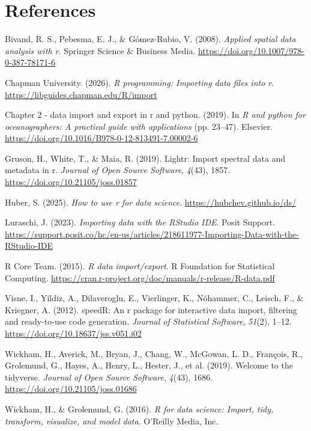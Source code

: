 \documentclass[
  doc,
  longtable,
  a4paper,
  nolmodern,
  notxfonts,
  notimes,
  colorlinks=true,linkcolor=blue,citecolor=blue,urlcolor=blue]{apa7}
\newlength{\cslhangindent}
\newenvironment{CSLReferences}[2] %
 {\begin{list}{}{%
  \setlength{\itemindent}{0pt}
  \setlength{\leftmargin}{0pt}
  \setlength{\parsep}{0pt}
  \ifodd #1
   \setlength{\leftmargin}{\cslhangindent}
   \setlength{\itemindent}{-1\cslhangindent}
  \fi
  \setlength{\itemsep}{#2\baselineskip}}}
 {\end{list}}
\begin{document}
\section{References}

\protect{}\label{refs}
\begin{CSLReferences}{1}{0}
Bivand, R. S., Pebesma, E. J., \& Gómez-Rubio, V. (2008). \emph{Applied
spatial data analysis with r}. Springer Science \& Business Media.
\url{https://doi.org/10.1007/978-0-387-78171-6}

Chapman University. (2026). \emph{R programming: Importing data files
into r}. \url{https://libguides.chapman.edu/R/import}

Chapter 2 - data import and export in r and python. (2019). In \emph{R
and python for oceanographers: A practical guide with applications} (pp.
23--47). Elsevier.
\url{https://doi.org/10.1016/B978-0-12-813491-7.00002-6}

Gruson, H., White, T., \& Maia, R. (2019). Lightr: Import spectral data
and metadata in r. \emph{Journal of Open Source Software}, \emph{4}(43),
1857. \url{https://doi.org/10.21105/joss.01857}

Huber, S. (2025). \emph{How to use r for data science}.
\url{https://hubchev.github.io/ds/}

Luraschi, J. (2023). \emph{Importing data with the RStudio IDE}. Posit
Support.
\url{https://support.posit.co/hc/en-us/articles/218611977-Importing-Data-with-the-RStudio-IDE}

R Core Team. (2015). \emph{R data import/export}. R Foundation for
Statistical Computing.
\url{https://cran.r-project.org/doc/manuals/r-release/R-data.pdf}

Visne, I., Yildiz, A., Dilaveroglu, E., Vierlinger, K., Nöhammer, C.,
Leisch, F., \& Kriegner, A. (2012). speedR: An r package for interactive
data import, filtering and ready-to-use code generation. \emph{Journal
of Statistical Software}, \emph{51}(2), 1--12.
\url{https://doi.org/10.18637/jss.v051.i02}

{Wickham, H., Averick, M., Bryan, J., Chang, W., McGowan, L. D.,
François, R., Grolemund, G., Hayes, A., Henry, L., Hester, J., et al.}
(2019). Welcome to the tidyverse. \emph{Journal of Open Source
Software}, \emph{4}(43), 1686. \url{https://doi.org/10.21105/joss.01686}

Wickham, H., \& Grolemund, G. (2016). \emph{R for data science: Import,
tidy, transform, visualize, and model data}. O'Reilly Media, Inc.

\end{CSLReferences}
\end{document}
